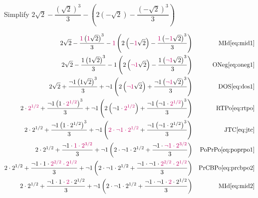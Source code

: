 \documentclass[20150903-160354-rs2.2-MarksMathNotebook.tex]{subfiles}
\begin{document}
\begin{example}[id:20141108-085327] \label{20141108-085327}  \hfill \\

Simplify $2\sqrt{2}-\dfrac{\left(\sqrt{2}\right)^3}{3}-\left(2\left(-\sqrt{2}\right)-\dfrac{\left(-\sqrt{2}\right)^3}{3} \right)$

\soln

\solnsteps
\begin{align*}
2 \sqrt{2}- \dfrac{\alert{1}\left(\alert{1}\sqrt{2}\right)^{3}}{3}-\alert{1} \left(2 \left(-\alert{1}\sqrt{2} \right) - \dfrac{\alert{1} \left(-\alert{1} \sqrt{2}\right)^{3}}{3} \right) && \text{MId} \eqref{eq:mid1} \\
2 \sqrt{2} - \dfrac{1 \left(1\sqrt{2}\right)^{3}}{3}-1 \left(2 \left(\alert{\neg 1} \sqrt{2} \right) - \dfrac{1 \left(\alert{\neg 1} \sqrt{2}\right)^{3}}{3} \right) && \text{ONeg} \eqref{eq:oneg1} \\
2 \sqrt{2} + \dfrac{\neg 1 \left(1\sqrt{2}\right)^{3}}{3}+ \neg 1 \left(2 \left(\alert{\neg 1} \sqrt{2} \right) + \dfrac{\neg 1 \left(\alert{\neg 1} \sqrt{2}\right)^{3}}{3} \right) && \text{DOS} \eqref{eq:dos1} \\
2 \cdot \alert{2^{1/2}} + \dfrac{\neg 1 \left(1 \cdot \alert{2^{1/2}}\right)^{3}}{3} + \neg 1 \left(2 \left(\neg  1 \cdot \alert{2^{1/2}} \right) + \dfrac{\neg 1 \left(\neg  1  \cdot \alert{2^{1/2}}\right)^{3}}{3} \right) && \text{RTPo} \eqref{eq:rtpo} \\
2 \cdot 2^{1/2} + \dfrac{\neg 1 \left(1 \cdot 2^{1/2}\right)^{3}}{3} + \neg 1 \left(\alert{2 \cdot \neg  1 \cdot 2^{1/2}} + \dfrac{\neg 1 \left(\neg 1  \cdot 2^{1/2}\right)^{3}}{3} \right) && \text{JTC} \eqref{eq:jtc} \\
2 \cdot 2^{1/2} + \dfrac{\neg 1 \cdot \alert{1 \cdot 2^{3/2}}}{3} + \neg 1 \left(2 \cdot \neg  1 \cdot 2^{1/2} + \dfrac{\neg 1 \cdot \alert{\neg 1  \cdot 2^{3/2}}}{3} \right) && \text{PoPrPo} \eqref{eq:poprpo1} \\
2 \cdot 2^{1/2} + \dfrac{\neg 1 \cdot 1 \cdot \alert{2^{2/2} \cdot 2^{1/2}}}{3} + \neg 1 \left(2 \cdot \neg  1 \cdot 2^{1/2} + \dfrac{\neg 1 \cdot \neg 1  \cdot \alert{2^{2/2} \cdot 2^{1/2}}}{3} \right) && \text{PrCBPo} \eqref{eq:prcbpo2} \\
2 \cdot 2^{1/2} + \dfrac{\neg 1 \cdot 1 \cdot \alert{2} \cdot 2^{1/2}}{3} + \neg 1 \left(2 \cdot \neg  1 \cdot 2^{1/2} + \dfrac{\neg 1 \cdot \neg 1  \cdot \alert{2} \cdot 2^{1/2}}{3} \right) && \text{MId} \eqref{eq:mid2} \\

\end{align*}
\end{example}
\end{document}
